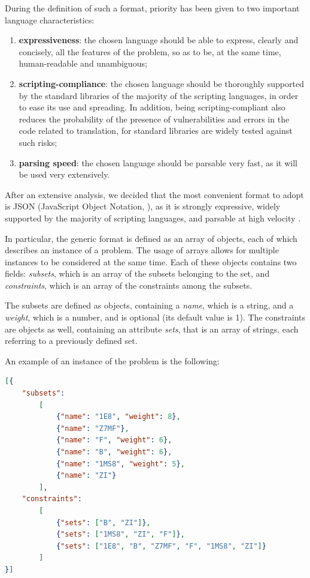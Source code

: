 \documentclass[oneside,a4paper]{article}
\begin{document}
During the definition of such a format, priority has been given to two important language characteristics:
\begin{enumerate}
    \item \textbf{expressiveness}: the chosen language should be able to express, clearly and concisely, all the features of the problem, so as to be, at the same time, human-readable and unambiguous;
    \item \textbf{scripting-compliance}: the chosen language should be thoroughly supported by the standard libraries of the majority of the scripting languages, in order to ease its use and spreading. In addition, being scripting-compliant also reduces the probability of the presence of vulnerabilities and errors in the code related to translation, for standard libraries are widely tested against such risks;
    \item \textbf{parsing speed}: the chosen language should be parsable very fast, as it will be used very extensively.
\end{enumerate}
After an extensive analysis, we decided that the most convenient format to adopt is JSON (JavaScript Object Notation, \cite{WebSite9}), as it is strongly expressive, widely supported by the majority of scripting languages, and parsable at high velocity \cite{WebSite7}.

In particular, the generic format is defined as an array of objects, each of which describes an instance of a problem. The usage of arrays allows for multiple instances to be considered at the same time. Each of these objects contains two fields: \textit{subsets}, which is an array of the subsets belonging to the set, and \textit{constraints}, which is an array of the constraints among the subsets. 

The subsets are defined as objects, containing a \textit{name}, which is a string, and a \textit{weight}, which is a number, and is optional (its default value is 1). The constraints are objects as well, containing an attribute \textit{sets}, that is an array of strings, each referring to a previously defined set.

An example of an instance of the problem is the following: 

\begin{lstlisting}[language=json,firstnumber=1]
[{
    "subsets": 
        [
            {"name": "1E8", "weight": 8},
            {"name": "Z7MF"},
            {"name": "F", "weight": 6},
            {"name": "B", "weight": 6},
            {"name": "1MS8", "weight": 5},
            {"name": "ZI"}
        ],
    "constraints":
        [
            {"sets": ["B", "ZI"]},
            {"sets": ["1MS8", "ZI", "F"]},
            {"sets": ["1E8", "B", "Z7MF", "F", "1MS8", "ZI"]}
        ]
}]
\end{lstlisting}
\end{document}
